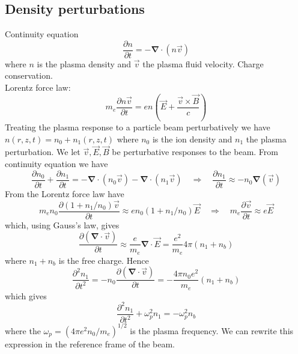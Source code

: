 \subsection{Density perturbations}
Continuity equation
\begin{equation}
\frac{\partial n}{\partial t}=-\mathbf{\nabla}\cdot (n\vec{v})
\end{equation}
where $n$ is the plasma density and $\vec{v}$ the plasma fluid velocity. Charge conservation.\\
Lorentz force law:
\begin{equation}
m_e\frac{\partial n\vec{v}}{\partial t}=en\left(\vec{E}+\frac{\vec{v}\times \vec{B}}{c}\right)
\end{equation}
Treating the plasma response to a particle beam perturbatively we have $n(r,z,t)=n_0+n_1(r,z,t)$ where $n_0$ is the ion density and $n_1$ the plasma perturbation. We let $\vec{v}, \vec{E}, \vec{B}$ be perturbative responses to the beam. From continuity equation we have
\begin{equation}
\frac{\partial n_0}{\partial t}+\frac{\partial n_1}{\partial t}=-\mathbf{\nabla}\cdot (n_0\vec{v})-\mathbf{\nabla}\cdot (n_1\vec{v}) \quad \Rightarrow \quad \frac{\partial n_1}{\partial t}\approx -n_0\mathbf{\nabla}(\vec{v})
\end{equation}
From the Lorentz force law have
\begin{equation}
m_en_0\frac{\partial (1+n_1/n_0)\vec{v}}{\partial t}\approx en_0(1+n_1/n_0)\vec{E} \quad \Rightarrow \quad  m_e\frac{\partial \vec{v}}{\partial t}\approx e\vec{E}
\end{equation}
which, using Gauss's law, gives
\begin{equation}
\frac{\partial (\mathbf{\nabla}\cdot\vec{v})}{\partial t}\approx \frac{e}{m_e}\mathbf{\nabla}\cdot\vec{E}= \frac{e^2}{m_e}4\pi (n_1+n_b)
\end{equation}
where $n_1+n_b$ is the free charge. Hence
\begin{equation}
\frac{\partial^2 n_1}{\partial t^2}= -n_0\frac{\partial (\mathbf{\nabla}\cdot\vec{v})}{\partial t}=-\frac{ 4\pi n_0e^2}{m_e} (n_1+n_b) 
\end{equation}
which gives
\begin{equation}
\frac{\partial^2 n_1}{\partial t^2}+\omega_p^2n_1=-\omega_p^2n_b
\end{equation}
where the $\omega_p=(4\pi e^2n_0/m_e)^{1/2}$ is the plasma frequency. We can rewrite this expression in the reference frame of the beam.\\
